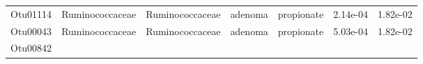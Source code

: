 \documentclass[11pt,]{article}
\begin{document}
\begin{longtable}[]{@{}ccccccc@{}}
\begin{minipage}[t]{0.09\columnwidth}\centering\strut
Otu01114\strut
\end{minipage} & \begin{minipage}[t]{0.17\columnwidth}\centering\strut
Ruminococcaceae\strut
\end{minipage} & \begin{minipage}[t]{0.17\columnwidth}\centering\strut
Ruminococcaceae\strut
\end{minipage} & \begin{minipage}[t]{0.09\columnwidth}\centering\strut
adenoma\strut
\end{minipage} & \begin{minipage}[t]{0.11\columnwidth}\centering\strut
propionate\strut
\end{minipage} & \begin{minipage}[t]{0.09\columnwidth}\centering\strut
2.14e-04\strut
\end{minipage} & \begin{minipage}[t]{0.09\columnwidth}\centering\strut
1.82e-02\strut
\end{minipage}\tabularnewline
\begin{minipage}[t]{0.09\columnwidth}\centering\strut
Otu00043\strut
\end{minipage} & \begin{minipage}[t]{0.17\columnwidth}\centering\strut
Ruminococcaceae\strut
\end{minipage} & \begin{minipage}[t]{0.17\columnwidth}\centering\strut
Ruminococcaceae\strut
\end{minipage} & \begin{minipage}[t]{0.09\columnwidth}\centering\strut
adenoma\strut
\end{minipage} & \begin{minipage}[t]{0.11\columnwidth}\centering\strut
propionate\strut
\end{minipage} & \begin{minipage}[t]{0.09\columnwidth}\centering\strut
5.03e-04\strut
\end{minipage} & \begin{minipage}[t]{0.09\columnwidth}\centering\strut
1.82e-02\strut
\end{minipage}\tabularnewline
\begin{minipage}[t]{0.09\columnwidth}\centering\strut
Otu00842\strut
\end{minipage} & \begin{minipage}[t]{0.17\columnwidth}\centering\strut

\end{minipage}
\end{longtable}
\end{document}
